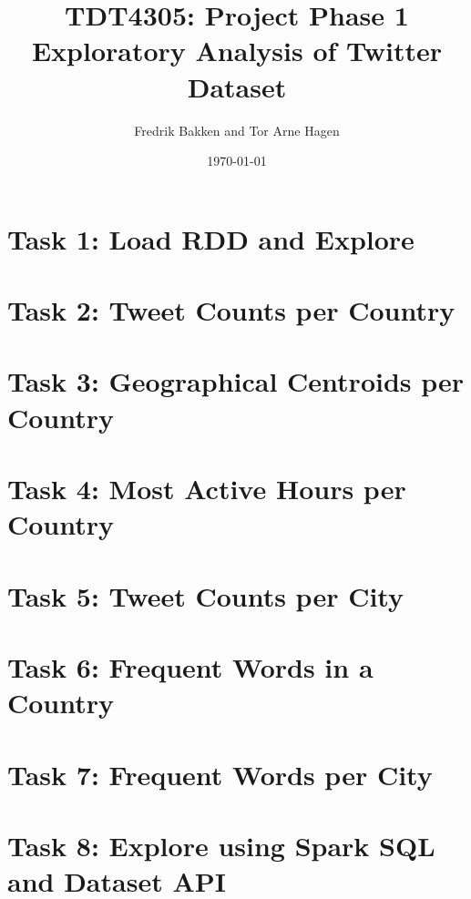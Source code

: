 \documentclass{article}
\title{TDT4305: Project Phase 1\\Exploratory Analysis of Twitter Dataset}
\author{Fredrik Bakken and Tor Arne Hagen}
\date{\today}
\begin{document}
\maketitle

\newpage
\section*{Task 1: Load RDD and Explore}

\section*{Task 2: Tweet Counts per Country}

\section*{Task 3: Geographical Centroids per Country}

\section*{Task 4: Most Active Hours per Country}

\section*{Task 5: Tweet Counts per City}

\section*{Task 6: Frequent Words in a Country}

\section*{Task 7: Frequent Words per City}

\section*{Task 8: Explore using Spark SQL and Dataset API}
\end{document}

